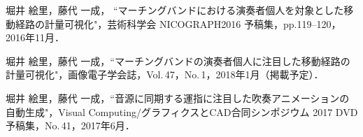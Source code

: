 \renewcommand{\refname}{公開文献}	
%
\begin{thebibliography}{55}
%
堀井 絵里，藤代 一成，
``マーチングバンドにおける演奏者個人を対象とした移動経路の計量可視化"，芸術科学会 NICOGRAPH2016 予稿集，pp.119--120，2016年11月．

堀井 絵里，藤代 一成，``マーチングバンドの演奏者個人に注目した移動経路の計量可視化"，画像電子学会誌，Vol.\,47，No.\,1，2018年1月（掲載予定）．

堀井 絵里，藤代 一成，``音源に同期する運指に注目した吹奏アニメーションの自動生成"，Visual Computing/グラフィクスとCAD合同シンポジウム 2017 DVD 予稿集，No.\,41，2017年6月．

\end{thebibliography}